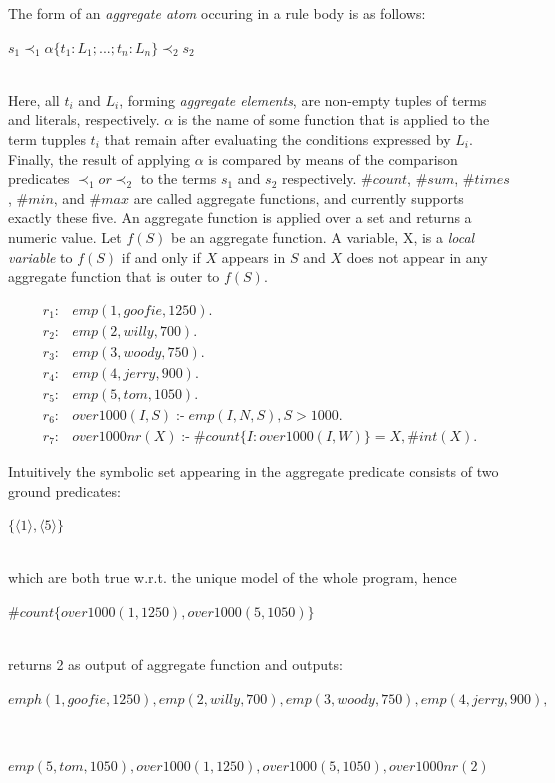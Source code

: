 \documentclass[14pt,a4paper, titlepage]{article}
\DeclareMathOperator{\leftimpl}{:-}
\begin{document}
The form of an \emph{aggregate atom} occuring in a rule 
body is as follows:\\ \centerline{$s_1 \prec_1 \alpha \{ 
t_1:L_1;...;t_n:L_n\} \prec_2 s_2$} 
\\ Here, all $\mathit{t_i}$ and $\mathit{L_i}$, forming 
\emph{aggregate elements}, are non-empty tuples of terms 
and literals, respectively. $\alpha$ is the name of some 
function that is applied to the term tupples \texttt{$t_i$} 
that remain after evaluating the conditions expressed by 
$L_i$. Finally,  the result of applying $\alpha$ is 
compared by means of the comparison predicates $\prec_1 or 
\prec_2$ to the terms $s_1$ and $s_2$ respectively. 
$\mathit{\#count}$, $\mathit{\#sum}$, $\mathit{\#times}$, 
$\mathit{\#min}$, and $\mathit{\#max}$ are called aggregate 
functions, and \dlvhex{} currently supports exactly these 
five. An aggregate function is applied over a set and 
returns a numeric value. Let $f(S)$ be an aggregate 
function. A variable, X, is a \emph{local variable} to 
$f(S)$ if and only if $X$ appears in $S$ and $X$ does not 
appear in any aggregate function that is outer to $f(S)$.
\begin{exmp}
\begin{align*}
r_1\colon& emp(1,goofie,1250).\\
r_2\colon& emp(2,willy,700).\\
r_3\colon& emp(3,woody,750).\\
r_4\colon& emp(4,jerry,900).\\
r_5\colon& emp(5,tom,1050). \\
r_6\colon& over1000(I,S) \leftimpl emp(I,N,S), S > 1000.\\
r_7\colon& over1000nr(X) \leftimpl \#count\{I : 
over1000(I,W)\} = X, \#int(X).
\end{align*}
\end{exmp}
Intuitively the symbolic set appearing in the aggregate 
predicate consists of two ground predicates: \\ 
\centerline{$\{\langle 1 \rangle,\langle 5 \rangle\}$}
\\which are both true w.r.t. the unique model of the whole 
program, hence \\ \centerline{$ 
\#count\{over1000(1,1250),over1000(5,1050)\}$} \\returns 2 
as output of aggregate function and outputs:\\ \centerline{ 
$\mathit{emph(1,goofie,1250),emp(2,willy,700),emp(3,woody,750),emp(4,jerry,900),}$}
\\ \centerline{ 
$\mathit{emp(5,tom,1050),over1000(1,1250),over1000(5,1050),over1000nr(2)}$}
\end{document}
